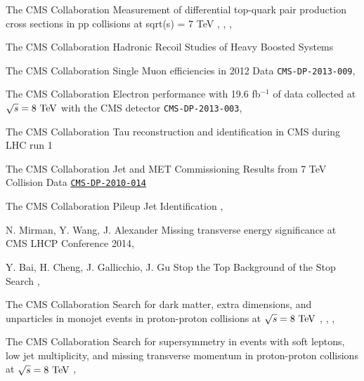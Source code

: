 {The CMS Collaboration}
{Measurement of differential top-quark pair production
cross sections in pp collisions at sqrt(s) = 7 TeV}
{, , , }

{The CMS Collaboration}
{Hadronic Recoil Studies of Heavy Boosted Systems}
{}


{The CMS Collaboration}
{Single Muon efficiencies in 2012 Data}
{\texttt{CMS-DP-2013-009}, }

{The CMS Collaboration}
{Electron performance with 19.6 fb$^{-1}$ of data collected at $\sqrt{s}=8~\text{TeV}$ with the CMS detector}
{\texttt{CMS-DP-2013-003}, }

{The CMS Collaboration}
{Tau reconstruction and identification in CMS during LHC run 1}
{}

{The CMS Collaboration}
{Jet and MET Commissioning Results from 7 TeV Collision Data}
{\href{http://cms.cern.ch/iCMS/jsp/openfile.jsp?type=DP&year=2010&files=DP2010_014.pdf}{\texttt{CMS-DP-2010-014}}}

{The CMS Collaboration}
{Pileup Jet Identification}
{, }


{N. Mirman, Y. Wang, J. Alexander}
{Missing transverse energy significance at CMS}
{LHCP Conference 2014, }

{Y. Bai, H. Cheng, J. Gallicchio, J. Gu}
{Stop the Top Background of the Stop Search}
{, }


{The CMS Collaboration}
{Search for dark matter, extra dimensions, and unparticles in monojet events in proton-proton collisions at $\sqrt{s} = 8~\text{TeV}$}
{, , , }

{The CMS Collaboration}
{Search for supersymmetry in events with soft leptons, low jet multiplicity, and missing
transverse momentum in proton-proton collisions at $\sqrt{s} = 8~\text{TeV}$}
{, }

